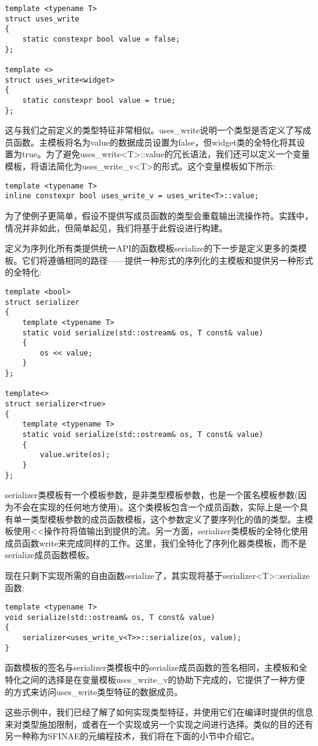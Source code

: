 \begin{lstlisting}[style=styleCXX]
template <typename T>
struct uses_write
{
	static constexpr bool value = false;
};

template <>
struct uses_write<widget>
{
	static constexpr bool value = true;
};
\end{lstlisting}

这与我们之前定义的类型特征非常相似。uses\_write说明一个类型是否定义了写成员函数。主模板将名为value的数据成员设置为false，但widget类的全特化将其设置为true。为了避免uses\_write<T>::value的冗长语法，我们还可以定义一个变量模板，将语法简化为uses\_write\_v<T>的形式。这个变量模板如下所示:

\begin{lstlisting}[style=styleCXX]
template <typename T>
inline constexpr bool uses_write_v = uses_write<T>::value;
\end{lstlisting}

为了使例子更简单，假设不提供写成员函数的类型会重载输出流操作符。实践中，情况并非如此，但简单起见，我们将基于此假设进行构建。

定义为序列化所有类提供统一API的函数模板serialize的下一步是定义更多的类模板。它们将遵循相同的路径——提供一种形式的序列化的主模板和提供另一种形式的全特化:

\begin{lstlisting}[style=styleCXX]
template <bool>
struct serializer
{
	template <typename T>
	static void serialize(std::ostream& os, T const& value)
	{
		os << value;
	}
};

template<>
struct serializer<true>
{
	template <typename T>
	static void serialize(std::ostream& os, T const& value)
	{
		value.write(os);
	}
};
\end{lstlisting}

serializer类模板有一个模板参数，是非类型模板参数，也是一个匿名模板参数(因为不会在实现的任何地方使用)。这个类模板包含一个成员函数，实际上是一个具有单一类型模板参数的成员函数模板，这个参数定义了要序列化的值的类型。主模板使用<{}<操作符将值输出到提供的流。另一方面，serializer类模板的全特化使用成员函数write来完成同样的工作。这里，我们全特化了序列化器类模板，而不是serialize成员函数模板。

现在只剩下实现所需的自由函数serialize了，其实现将基于serializer<T>::serialize函数:

\begin{lstlisting}[style=styleCXX]
template <typename T>
void serialize(std::ostream& os, T const& value)
{
	serializer<uses_write_v<T>>::serialize(os, value);
}
\end{lstlisting}

函数模板的签名与serializer类模板中的serialize成员函数的签名相同，主模板和全特化之间的选择是在变量模板uses\_write\_v的协助下完成的，它提供了一种方便的方式来访问uses\_write类型特征的数据成员。

这些示例中，我们已经了解了如何实现类型特征，并使用它们在编译时提供的信息来对类型施加限制，或者在一个实现或另一个实现之间进行选择。类似的目的还有另一种称为SFINAE的元编程技术，我们将在下面的小节中介绍它。


























